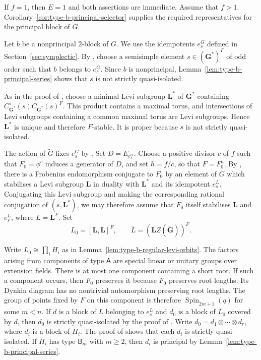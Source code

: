 \documentclass[10pt]{amsart}
\theoremstyle{definition}
\renewcommand{\geq}{\geqslant}
\let\oldendproof\endproof
\renewenvironment{proof}[1][\proofname]{%
  \oldproof[\bfseries #1]%
}{\oldendproof}
\numberwithin{equation}{section}
\numberwithin{table}{section}
\begin{document}
\begin{proof}
If $f=1$, then $E=1$ and both assertions are immediate.
Assume that $f>1$.
Corollary~\ref{cor:type-b-principal-selector} supplies the required
representatives for the principal block of $G$.

Let $b$ be a nonprincipal $2$-block of $G$.
We use the idempotents $e_s^G$ defined in Section~\ref{sec:symplectic}.
By \cite[Theorem~9.12]{CabanesEnguehard2004}, choose a semisimple
element $s\in(\mathbf G^*)^F$ of odd order such that $b$ belongs to
$e_s^G$.
Since $b$ is nonprincipal, Lemma~\ref{lem:type-b-principal-series}
shows that $s$ is not strictly quasi-isolated.

As in the proof of \cite[Theorem~5.7]{FengLiZhang2022Jordan}, choose
a minimal Levi subgroup $\mathbf L^*$ of $\mathbf G^*$ containing
$C_{\mathbf G^*}^{\circ}(s)C_{\mathbf G^*}(s)^F$.
This product contains a maximal torus, and intersections of Levi
subgroups containing a common maximal torus are Levi subgroups.
Hence $\mathbf L^*$ is unique and therefore $F$-stable. It is proper
because $s$ is not strictly quasi-isolated.

The action of $\widetilde G$ fixes $e_s^G$ by
\cite[Lemma~7.4]{BonnafeDatRouquier2017}. Set $D=E_{e_s^G}$.
Choose a positive divisor $c$ of $f$ such that $F_0=\phi^c$ induces
a generator of $D$, and set $h=f/c$, so that $F=F_0^h$.
By \cite[Lemma~4.5(a)--(b)]{Ruhstorfer2022Derived}, there is a Frobenius
endomorphism conjugate to $F_0$ by an element of $G$ which stabilises
a Levi subgroup $\mathbf L$ in duality with $\mathbf L^*$ and its
idempotent $e_s^L$. Conjugating this Levi subgroup and making the
corresponding rational conjugation of $(s,\mathbf L^*)$, we may therefore
assume that $F_0$ itself stabilises $\mathbf L$ and $e_s^L$,
where $L=\mathbf L^F$. Set
\[
 L_0=[\mathbf L,\mathbf L]^F,\qquad
 \widetilde L=(\mathbf LZ(\widetilde{\mathbf G}))^F.
\]

Write $L_0\cong\prod_i H_i$ as in
Lemma~\ref{lem:type-b-regular-levi-orbits}.
The factors arising from components of type $\mathsf A$ are special
linear or unitary groups over extension fields.
There is at most one component containing a short root.
If such a component occurs, then $F_0$ preserves it because $F_0$
preserves root lengths. Its Dynkin diagram has no nontrivial
automorphism preserving root lengths. The group of points fixed by
$F$ on this component is therefore $\operatorname{Spin}_{2m+1}(q)$
for some $m<n$.
If $d$ is a block of $L$ belonging to $e_s^L$ and $d_0$ is a block
of $L_0$ covered by $d$, then $d_0$ is strictly quasi-isolated by
the proof of \cite[Theorem~5.7]{FengLiZhang2022Jordan}.
Write $d_0=d_1\otimes\cdots\otimes d_r$, where $d_i$ is a block of
$H_i$. The proof of \cite[Proposition~5.6]{FengLiZhang2022Jordan}
shows that each $d_i$ is strictly quasi-isolated.
If $H_i$ has type $\mathsf B_m$ with $m\geq2$, then $d_i$ is
principal by Lemma~\ref{lem:type-b-principal-series}.


\end{proof}
\end{document}
